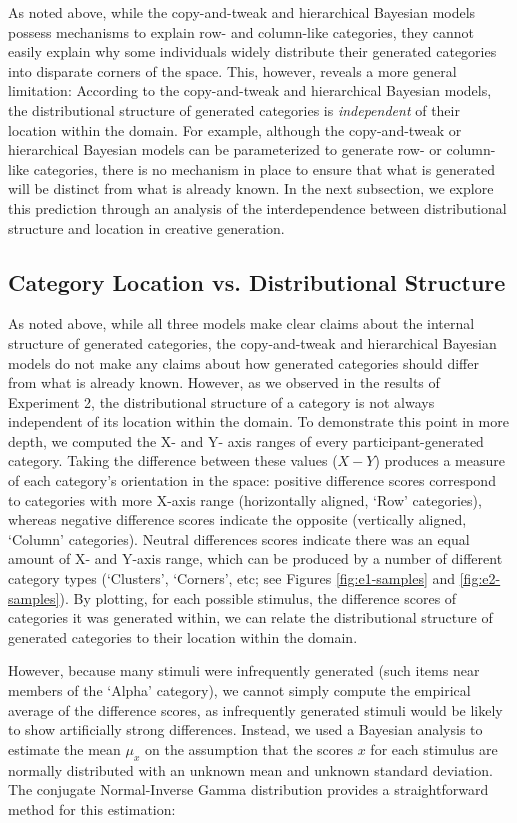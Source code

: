 \documentclass[12pt]{article}
\begin{document}
\begin{flushleft}
As noted above, while the copy-and-tweak and hierarchical Bayesian models
possess mechanisms to explain row- and column-like categories, they cannot
easily explain why some individuals widely distribute their generated categories
into disparate corners of the space. This, however, reveals a more general
limitation: According to the copy-and-tweak and hierarchical Bayesian models,
the distributional structure of generated categories is {\em independent} of
their location within the domain. For example, although the copy-and-tweak or
hierarchical Bayesian models can be parameterized to generate row- or
column-like categories, there is no mechanism in place to ensure that what is
generated will be distinct from what is already known. In the next subsection,
we explore this prediction through an analysis of the interdependence between
distributional structure and location in creative generation.

\subsection{Category Location vs. Distributional Structure}
\label{section:individual-diff}
As noted above, while all three models make clear claims about the internal
structure of generated categories, the copy-and-tweak and hierarchical Bayesian
models do not make any claims about how generated categories should differ from
what is already known. However, as we observed in the results of Experiment 2,
the distributional structure of a category is not always independent of its
location within the domain. To demonstrate this point in more depth, we computed
the X- and Y- axis ranges of every participant-generated category. Taking the
difference between these values ($X-Y$) produces a measure of each category's
orientation in the space: positive difference scores correspond to categories
with more X-axis range (horizontally aligned, `Row' categories), whereas
negative difference scores indicate the opposite (vertically aligned, `Column'
categories). Neutral differences scores indicate there was an equal amount of X-
and Y-axis range, which can be produced by a number of different category types
(`Clusters', `Corners', etc; see Figures \ref{fig:e1-samples} and
\ref{fig:e2-samples}). By plotting, for each possible stimulus, the difference
scores of categories it was generated within, we can relate the distributional
structure of generated categories to their location within the domain.

However, because many stimuli were infrequently generated (such items near
members of the `Alpha' category), we cannot simply compute the empirical average
of the difference scores, as infrequently generated stimuli would be likely to
show artificially strong differences. Instead, we used a Bayesian analysis to
estimate the mean $\mu_x$ on the assumption that the scores $x$ for each
stimulus are normally distributed with an unknown mean and unknown standard
deviation. The conjugate Normal-Inverse Gamma distribution provides a
straightforward method for this estimation:



\end{flushleft}
\end{document}
